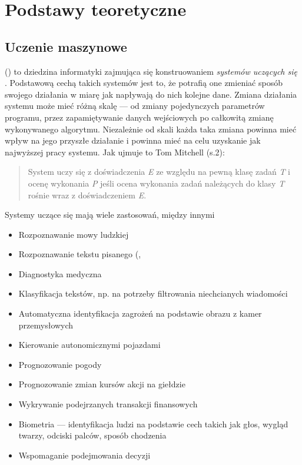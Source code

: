 \chapter{Podstawy teoretyczne}

\section{Uczenie maszynowe}
 () to dziedzina informatyki zajmująca się konstruowaniem \textit{systemów uczących się} \cite{krawiec2003uczenie}. Podstawową cechą takich systemów jest to, że potrafią one zmieniać sposób swojego działania w miarę jak napływają do nich kolejne dane. Zmiana działania systemu może mieć różną skalę --- od zmiany pojedynczych parametrów programu, przez zapamiętywanie danych wejściowych po całkowitą zmianę wykonywanego algorytmu. Niezależnie od skali każda taka zmiana powinna mieć wpływ na jego przyszłe działanie i powinna mieć na celu uzyskanie jak najwyższej  pracy systemu. Jak ujmuje to Tom Mitchell \cite{Mitchell:1997:ML:541177} (s.2):
\begin{quote}
System uczy się z doświadczenia \textit{E} ze względu na pewną klasę zadań \textit{T} i ocenę wykonania \textit{P} jeśli ocena wykonania zadań należących do klasy \textit{T} rośnie wraz z doświadczeniem \textit{E}.
\end{quote}



Systemy uczące się mają wiele zastosowań, między innymi \cite{krawiec2003uczenie}
\begin{itemize}
	\item Rozpoznawanie mowy ludzkiej
	\item Rozpoznawanie tekstu pisanego (, 
	\item Diagnostyka medyczna
	\item Klasyfikacja tekstów, np. na potrzeby filtrowania niechcianych wiadomości
	\item Automatyczna identyfikacja zagrożeń na podstawie obrazu z kamer przemysłowych
	\item Kierowanie autonomicznymi pojazdami
	\item Prognozowanie pogody
	\item Prognozowanie zmian kursów akcji na giełdzie
	\item Wykrywanie podejrzanych transakcji finansowych
	\item Biometria --- identyfikacja ludzi na podstawie cech takich jak głos, wygląd twarzy, odciski palców, sposób chodzenia
	\item Wspomaganie podejmowania decyzji
\end{itemize}

